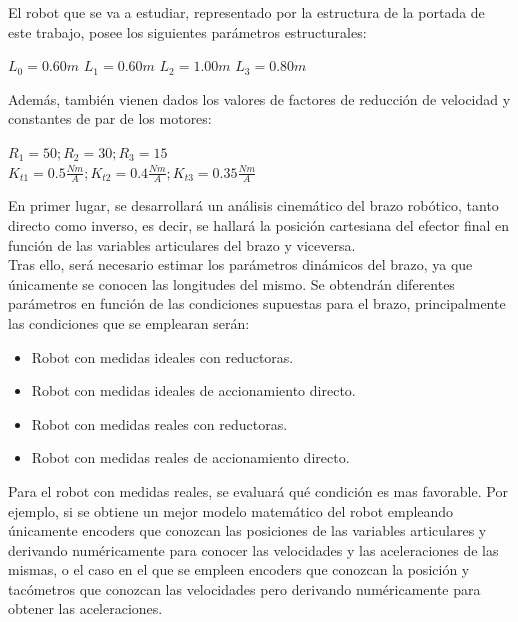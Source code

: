 \documentclass[a4paper,twoside]{article}
\begin{document}
	El robot que se va a estudiar, representado por la estructura de la portada de este trabajo, posee los siguientes parámetros estructurales:
	\begin{center}
		$L_0 = 0.60 m$ \hspace{0.5 cm} $L_1 = 0.60 m$ \hspace{0.5 cm}  $L_2 = 1.00 m$\hspace{0.5 cm}  $L_3 = 0.80 m$
	\end{center}

	Además, también vienen dados los valores de factores de reducción de velocidad y constantes de par de los motores:
	\begin{center}
		$R_1 = 50; R_2 = 30; R_3 = 15$\\ \vspace{0.2 cm}
		$K_{t1} = 0.5 \frac{Nm}{A}; K_{t2} = 0.4 \frac{Nm}{A}; K_{t3} = 0.35 \frac{Nm}{A}$
	\end{center}

En primer lugar, se desarrollará un análisis cinemático del brazo robótico, tanto directo como inverso, es decir, se hallará la posición cartesiana del efector final en función de las variables articulares del brazo y viceversa.\\
Tras ello, será necesario estimar los parámetros dinámicos del brazo, ya que únicamente se conocen las longitudes del mismo. Se obtendrán diferentes parámetros en función de las condiciones supuestas para el brazo, principalmente las condiciones que se emplearan serán:
\begin{itemize}
	\item Robot con medidas ideales con reductoras.
	\item Robot con medidas ideales de accionamiento directo.
	\item Robot con medidas reales con reductoras.
	\item Robot con medidas reales de accionamiento directo.
\end{itemize}
Para el robot con medidas reales, se evaluará qué condición es mas favorable. Por ejemplo, si se obtiene un mejor modelo matemático del robot empleando únicamente encoders que conozcan las posiciones de las variables articulares y derivando numéricamente para conocer las velocidades y las aceleraciones de las mismas, o el caso en el que se empleen encoders que conozcan la posición y tacómetros que conozcan las velocidades pero derivando numéricamente para obtener las aceleraciones.\\
\end{document}
